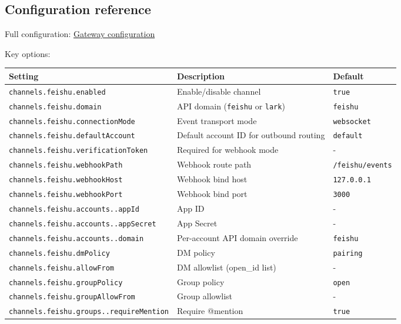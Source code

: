 \hrulefill


\subsection{Configuration reference}


Full configuration: \href{/gateway/configuration}{Gateway configuration}

Key options:


\begin{table}[h]
\centering
\small
\begin{tabular}{|l|l|l|}
\hline
Setting & Description & Default \\
\hline
\texttt{channels.feishu.enabled} & Enable/disable channel & \texttt{true} \\
\hline
\texttt{channels.feishu.domain} & API domain (\texttt{feishu} or \texttt{lark}) & \texttt{feishu} \\
\hline
\texttt{channels.feishu.connectionMode} & Event transport mode & \texttt{websocket} \\
\hline
\texttt{channels.feishu.defaultAccount} & Default account ID for outbound routing & \texttt{default} \\
\hline
\texttt{channels.feishu.verificationToken} & Required for webhook mode & - \\
\hline
\texttt{channels.feishu.webhookPath} & Webhook route path & \texttt{/feishu/events} \\
\hline
\texttt{channels.feishu.webhookHost} & Webhook bind host & \texttt{127.0.0.1} \\
\hline
\texttt{channels.feishu.webhookPort} & Webhook bind port & \texttt{3000} \\
\hline
\texttt{channels.feishu.accounts..appId} & App ID & - \\
\hline
\texttt{channels.feishu.accounts..appSecret} & App Secret & - \\
\hline
\texttt{channels.feishu.accounts..domain} & Per-account API domain override & \texttt{feishu} \\
\hline
\texttt{channels.feishu.dmPolicy} & DM policy & \texttt{pairing} \\
\hline
\texttt{channels.feishu.allowFrom} & DM allowlist (open\_id list) & - \\
\hline
\texttt{channels.feishu.groupPolicy} & Group policy & \texttt{open} \\
\hline
\texttt{channels.feishu.groupAllowFrom} & Group allowlist & - \\
\hline
\texttt{channels.feishu.groups..requireMention} & Require @mention & \texttt{true} \\

\end{tabular}
\end{table}

